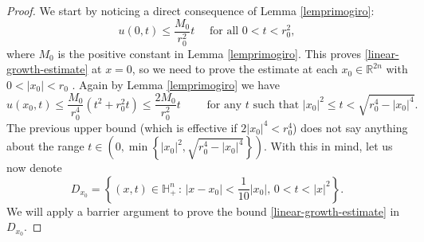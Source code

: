 \documentclass[10pt,a4paper]{amsart}
\def \H {{\mathbb H}}
\newcommand{\R}{{\mathbb R}}
\begin{document}
\begin{proof}
We start by noticing a direct consequence of Lemma \ref{lemprimogiro}:
\begin{equation}\label{atzero}
u(0,t)\leq \frac{M_0}{r^2_0} t \quad \text{ for all } 0<t<r_0^2,
\end{equation}
where $M_0$ is the positive constant in Lemma \ref{lemprimogiro}. This proves \eqref{linear-growth-estimate} at $x = 0$, so we need to prove the estimate at each $x_0\in\R^{2n}$ with $0<|x_0|<r_0$ . Again by Lemma \ref{lemprimogiro} we have
\begin{equation}\label{atx0sopra}
u(x_0,t)\leq \frac{M_0}{r^4_0} \left(t^2+r_0^2t \right )\leq \frac{2 M_0}{r^2_0} t \qquad \mbox{ for any } t \mbox{ such that } |x_0|^2\leq t<\sqrt{r_0^4 - |x_0|^4}.
\end{equation}
The previous upper bound (which is effective if $2|x_0|^4<r_0^4$) does not say anything about the range $t\in (0,\min\left\{|x_0|^2, \sqrt{r_0^4 - |x_0|^4}\right\})$. With this in mind, let us now denote
$$
D_{x_0}=\left\{(x,t)\in\H^n_+ \,:\, |x-x_0|< \frac{1}{10}|x_0|,\, 0<t< |x|^2\right\}.$$
We will apply a barrier argument to prove the bound \eqref{linear-growth-estimate} in $D_{x_0}$.


\end{proof}
\end{document}

